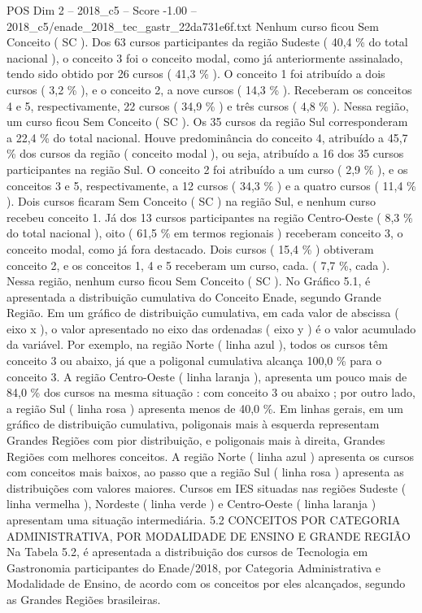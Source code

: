 \begin{textsample}{POS Dim 2 – 2018\_c5 – Score -1.00 – 2018\_c5/enade\_2018\_tec\_gastr\_22da731e6f.txt}
Nenhum curso ficou Sem Conceito ( SC ).
Dos 63 cursos participantes da região Sudeste ( 40,4 \% do total nacional ), o conceito 3 foi o conceito modal, como já anteriormente assinalado, tendo sido obtido por 26 cursos ( 41,3 \% ).
O conceito 1 foi atribuído a dois cursos ( 3,2 \% ), e o conceito 2, a nove cursos ( 14,3 \% ).
Receberam os conceitos 4 e 5, respectivamente, 22 cursos ( 34,9 \% ) e três cursos ( 4,8 \% ).
Nessa região, um curso ficou Sem Conceito ( SC ).
Os 35 cursos da região Sul corresponderam a 22,4 \% do total nacional.
Houve predominância do conceito 4, atribuído a 45,7 \% dos cursos da região ( conceito modal ), ou seja, atribuído a 16 dos 35 cursos participantes na região Sul.
O conceito 2 foi atribuído a um curso ( 2,9 \% ), e os conceitos 3 e 5, respectivamente, a 12 cursos ( 34,3 \% ) e a quatro cursos ( 11,4 \% ).
Dois cursos ficaram Sem Conceito ( SC ) na região Sul, e nenhum curso recebeu conceito 1.
Já dos 13 cursos participantes na região Centro-Oeste ( 8,3 \% do total nacional ), oito ( 61,5 \% em termos regionais ) receberam conceito 3, o conceito modal, como já fora destacado.
Dois cursos ( 15,4 \% ) obtiveram conceito 2, e os conceitos 1, 4 e 5 receberam um curso, cada. ( 7,7 \%, cada ).
Nessa região, nenhum curso ficou Sem Conceito ( SC ).
No Gráfico 5.1, é apresentada a distribuição cumulativa do Conceito Enade, segundo Grande Região.
Em um gráfico de distribuição cumulativa, em cada valor de abscissa ( eixo x ), o valor apresentado no eixo das ordenadas ( eixo y ) é o valor acumulado da variável.
Por exemplo, na região Norte ( linha azul ), todos os cursos têm conceito 3 ou abaixo, já que a poligonal cumulativa alcança 100,0 \% para o conceito 3.
A região Centro-Oeste ( linha laranja ), apresenta um pouco mais de 84,0 \% dos cursos na mesma situação : com conceito 3 ou abaixo ; por outro lado, a região Sul ( linha rosa ) apresenta menos de 40,0 \%.
Em linhas gerais, em um gráfico de distribuição cumulativa, poligonais mais à esquerda representam Grandes Regiões com pior distribuição, e poligonais mais à direita, Grandes Regiões com melhores conceitos.
A região Norte ( linha azul ) apresenta os cursos com conceitos mais baixos, ao passo que a região Sul ( linha rosa ) apresenta as distribuições com valores maiores.
Cursos em IES situadas nas regiões Sudeste ( linha vermelha ), Nordeste ( linha verde ) e Centro-Oeste ( linha laranja ) apresentam uma situação intermediária. 5.2 CONCEITOS POR CATEGORIA ADMINISTRATIVA, POR MODALIDADE DE ENSINO E GRANDE REGIÃO Na Tabela 5.2, é apresentada a distribuição dos cursos de Tecnologia em Gastronomia participantes do Enade/2018, por Categoria Administrativa e Modalidade de Ensino, de acordo com os conceitos por eles alcançados, segundo as Grandes Regiões brasileiras.

\end{textsample}
